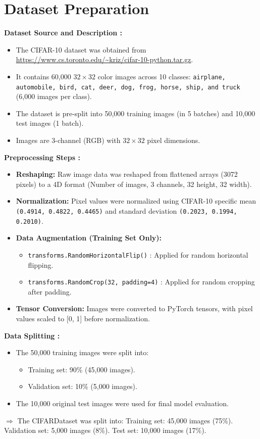 \documentclass[12pt, a4paper]{report}
\begin{document}
\section{Dataset Preparation}
\noindent \textbf{Dataset Source and Description :}
\begin{itemize}
    \item The CIFAR-10 dataset was obtained from \url{https://www.cs.toronto.edu/~kriz/cifar-10-python.tar.gz}.
    \item It contains 60,000 $32 \times 32$ color images across 10 classes: \texttt{airplane, automobile, bird, cat, deer, dog, frog, horse, ship, and truck} (6,000 images per class).
    \item The dataset is pre-split into 50,000 training images (in 5 batches) and 10,000 test images (1 batch).
    \item Images are 3-channel (RGB) with $32 \times 32$ pixel dimensions.
\end{itemize}
\textbf{Preprocessing Steps :}
\begin{itemize}
    \item \textbf{Reshaping:} Raw image data was reshaped from flattened arrays (3072 pixels) to a 4D format (Number of images, 3 channels, 32 height, 32 width).
    \item \textbf{Normalization:} Pixel values were normalized using CIFAR-10 specific mean \texttt{(0.4914, 0.4822, 0.4465)} and standard deviation \texttt{(0.2023, 0.1994, 0.2010)}.
    \item \textbf{Data Augmentation (Training Set Only):}
    \begin{itemize}
        \item \texttt{transforms.RandomHorizontalFlip()} : Applied for random horizontal flipping.
        \item \texttt{transforms.RandomCrop(32, padding=4)} : Applied for random cropping after padding.
    \end{itemize}
    \item \textbf{Tensor Conversion:} Images were converted to PyTorch tensors, with pixel values scaled to [0, 1] before normalization.
\end{itemize}
\textbf{Data Splitting :}
\begin{itemize}
    \item The 50,000 training images were split into:
    \begin{itemize}
        \item Training set: 90\% (45,000 images).
        \item Validation set: 10\% (5,000 images).
    \end{itemize}
    \item The 10,000 original test images were used for final model evaluation.
\end{itemize}
$\Rightarrow$ The CIFARDataset was split into:
Training set: 45,000 images (75\%).
Validation set: 5,000 images (8\%).
Test set: 10,000 images (17\%).
\end{document}
